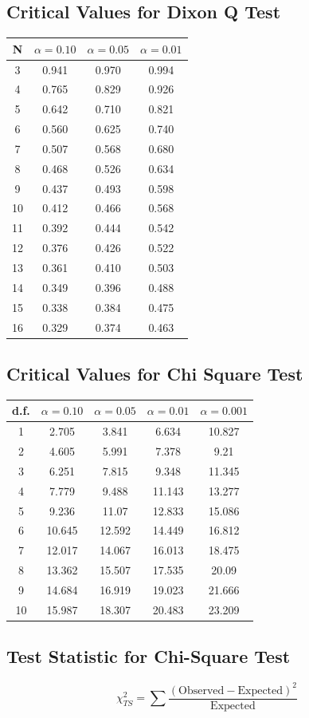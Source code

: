 \documentclass[a4paper,12pt]{article}
\begin{document}
\subsection*{Critical Values for Dixon Q Test}
{
	\Large
	\begin{center}
		\begin{tabular}{|c|c|c|c|}
			\hline  N  & $\alpha=0.10$  & $\alpha=0.05$  & $\alpha=0.01$  \\ \hline
			3  & 0.941 & 0.970 & 0.994 \\ \hline
			4  & 0.765 & 0.829 & 0.926 \\ \hline
			5  & 0.642 & 0.710  & 0.821 \\ \hline
			6  & 0.560 & 0.625 & 0.740 \\ \hline
			7  & 0.507 & 0.568 & 0.680  \\ \hline
			8  & 0.468 & 0.526 & 0.634 \\ \hline
			9  & 0.437 & 0.493 & 0.598 \\ \hline
			10 & 0.412 & 0.466 & 0.568 \\ \hline
			11 & 0.392 & 0.444 & 0.542 \\ \hline
			12 & 0.376 & 0.426 & 0.522 \\ \hline
			13 & 0.361 & 0.410 & 0.503 \\ \hline
			14 & 0.349 & 0.396 & 0.488 \\ \hline
			15 & 0.338 & 0.384 & 0.475 \\ \hline
			16 & 0.329 & 0.374 & 0.463 \\ \hline
		\end{tabular} 
	\end{center}
}
\newpage
\subsection*{Critical Values for Chi Square Test}
{
	\Large
	\begin{center}
		\begin{tabular}{|c|c|c|c|c|}
			\hline 
			d.f.	&	$\alpha=0.10$	&	$\alpha=0.05$	&	$\alpha=0.01$	&	$\alpha=0.001$	\\ \hline
			1	& 	2.705	&	3.841	&	6.634	&	10.827	\\ \hline
			2	&	4.605	&	5.991	&	7.378	&	9.21	\\ \hline
			3	&	6.251	&	7.815	&	9.348	&	11.345	\\ \hline
			4	&	7.779	&	9.488	&	11.143	&	13.277	\\ \hline
			5	&	9.236	&	11.07	&	12.833	&	15.086	\\ \hline
			6	&	10.645	&	12.592	&	14.449	&	16.812	\\ \hline
			7	&	12.017	&	14.067	&	16.013	&	18.475	\\ \hline
			8	&	13.362	&	15.507	&	17.535	&	20.09	\\ \hline
			9	&	14.684	&	16.919	&	19.023	&	21.666	\\ \hline
			10	&	15.987	&	18.307	&	20.483	&	23.209	\\ \hline
		\end{tabular} 
	\end{center}
}
\bigskip
\subsection*{Test Statistic for Chi-Square Test}
{
\Large
\[ \chi^2_{TS} = \sum \frac{(\mbox{Observed} -\mbox{Expected} )^2}{\mbox{Expected} }\]
}
\end{document}

